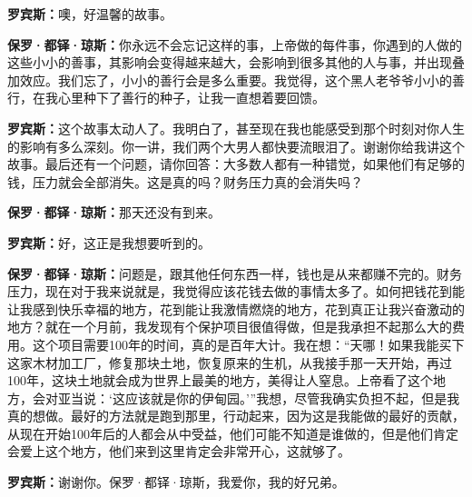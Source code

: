 \begin{BookQuote}
\textbf{罗宾斯：}噢，好温馨的故事。
\end{BookQuote}

\begin{BookQuote}
\textbf{保罗·都铎·琼斯：}你永远不会忘记这样的事，上帝做的每件事，你遇到的人做的这些小小的善事，其影响会变得越来越大，会影响到很多其他的人与事，并出现叠加效应。我们忘了，小小的善行会是多么重要。我觉得，这个黑人老爷爷小小的善行，在我心里种下了善行的种子，让我一直想着要回馈。
\end{BookQuote}

\begin{BookQuote}
\textbf{罗宾斯：}这个故事太动人了。我明白了，甚至现在我也能感受到那个时刻对你人生的影响有多么深刻。你一讲，我们两个大男人都快要流眼泪了。谢谢你给我讲这个故事。最后还有一个问题，请你回答：大多数人都有一种错觉，如果他们有足够的钱，压力就会全部消失。这是真的吗？财务压力真的会消失吗？
\end{BookQuote}

\begin{BookQuote}
\textbf{保罗·都铎·琼斯：}那天还没有到来。
\end{BookQuote}

\begin{BookQuote}
\textbf{罗宾斯：}好，这正是我想要听到的。
\end{BookQuote}

\begin{BookQuote}
\textbf{保罗·都铎·琼斯：}问题是，跟其他任何东西一样，钱也是从来都赚不完的。财务压力，现在对于我来说就是，我觉得应该花钱去做的事情太多了。如何把钱花到能让我感到快乐幸福的地方，花到能让我激情燃烧的地方，花到真正让我兴奋激动的地方？就在一个月前，我发现有个保护项目很值得做，但是我承担不起那么大的费用。这个项目需要100年的时间，真的是百年大计。我在想：“天哪！如果我能买下这家木材加工厂，修复那块土地，恢复原来的生机，从我接手那一天开始，再过100年，这块土地就会成为世界上最美的地方，美得让人窒息。上帝看了这个地方，会对亚当说：‘这应该就是你的伊甸园。’”我想，尽管我确实负担不起，但是我真的想做。最好的方法就是跑到那里，行动起来，因为这是我能做的最好的贡献，从现在开始100年后的人都会从中受益，他们可能不知道是谁做的，但是他们肯定会爱上这个地方，他们来到这里肯定会非常开心，这就够了。
\end{BookQuote}

\begin{BookQuote}
\textbf{罗宾斯：}谢谢你。保罗·都铎·琼斯，我爱你，我的好兄弟。
\end{BookQuote}
